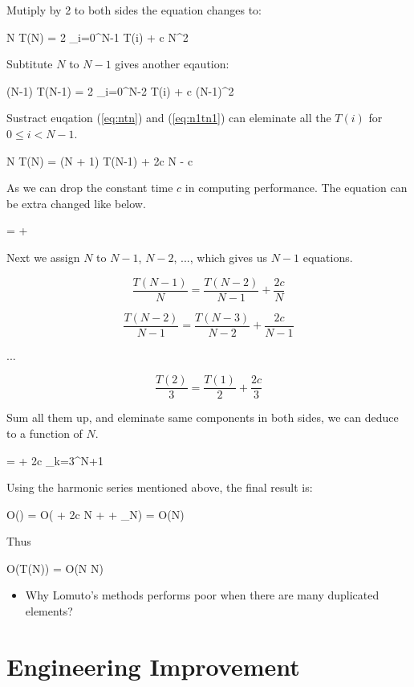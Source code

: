 \documentclass{article}
\begin{document}
Mutiply by 2 to both sides the equation changes to:

\be
N T(N) = 2 \sum_{i=0}^{N-1} T(i) + c N^2
\label{eq:ntn}
\ee

Subtitute $N$ to $N-1$ gives another eqaution:

\be
(N-1) T(N-1) = 2 \sum_{i=0}^{N-2} T(i) + c (N-1)^2
\label{eq:n1tn1}
\ee

Sustract euqation (\ref{eq:ntn}) and (\ref{eq:n1tn1}) can eleminate all the $T(i)$ for $0 \leq i < N-1$.

\be
N T(N) = (N + 1) T(N-1) + 2c N - c
\ee

As we can drop the constant time $c$ in computing performance. The equation can be extra changed like
below.

\be
{} =  + 
\ee

Next we assign $N$ to $N-1$, $N-2$, ..., which gives us $N-1$ equations.

\[
\frac{T(N-1)}{N} = \frac{T(N-2)}{N-1} + \frac{2c}{N}
\]

\[
\frac{T(N-2)}{N-1} = \frac{T(N-3)}{N-2} + \frac{2c}{N-1}
\]

...

\[
\frac{T(2)}{3} = \frac{T(1)}{2} + \frac{2c}{3}
\]

Sum all them up, and eleminate same components in both sides, we can deduce to a function of $N$.

\be
{} =  + 2c \sum_{k=3}^{N+1} 
\ee

Using the harmonic series mentioned above, the final result is:

\be
O() = O( + 2c \ln N + \gamma + \epsilon_N) = O(\lg N)
\ee

Thus

\be
O(T(N)) = O(N \lg N)
\ee

\begin{Exercise}
\begin{itemize}
\item Why Lomuto's methods performs poor when there are many duplicated elements?
\end{itemize}  
\end{Exercise}


\section{Engineering Improvement}
\end{document}
